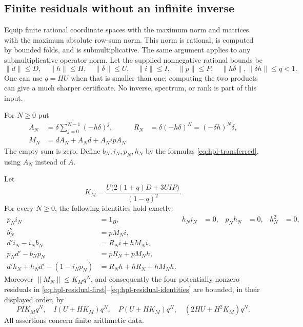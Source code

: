 \subsection{Finite residuals without an infinite inverse}

Equip finite rational coordinate spaces with the maximum norm and matrices
with the maximum absolute row-sum norm.  This norm is rational, is computed
by bounded folds, and is submultiplicative.  The same argument applies to
any submultiplicative operator norm.  Let the supplied nonnegative rational
bounds be
\[
 \|d\|\le D,\quad \|h\|\le H,\quad \|\delta\|\le U,
 \quad\|i\|\le I,\quad\|p\|\le P,
 \quad\|h\delta\|,\|\delta h\|\le q<1.
\]
One can use $q=HU$ when that is smaller than one; computing the two products
can give a much sharper certificate.  No inverse, spectrum, or rank is
part of this input.

For $N\ge0$ put
\begin{align}
 A_N&=\delta\sum_{j=0}^{N-1}(-h\delta)^j,
 &R_N&=\delta(-h\delta)^N=(-\delta h)^N\delta,\\
 M_N&=dA_N+A_Nd+A_NipA_N.
 \label{eq:hpl-finite-data}
\end{align}
The empty sum is zero.  Define $b_N,i_N,p_N,h_N$ by the formulas
\eqref{eq:hpl-transferred}, using $A_N$ instead of $A$.

\begin{theorem}
\label{thm:hpl-finite}
Let
\begin{equation}
 K_M=\frac{U\bigl(2(1+q)D+3UIP\bigr)}{(1-q)^2}.
 \label{eq:hpl-K}
\end{equation}
For every $N\ge0$, the following identities hold exactly:
\begin{align}
 p_Ni_N&=1_B,&h_Ni_N&=0,&p_Nh_N&=0,&h_N^2&=0,\label{eq:hpl-finite-normalizations}\\
 b_N^2&=pM_Ni,\label{eq:hpl-residual-first}\\
 d'i_N-i_Nb_N&=R_Ni+hM_Ni,\\
 p_Nd'-b_Np_N&=pR_N+pM_Nh,\\
 d'h_N+h_Nd'-(1-i_Np_N)&=R_Nh+hR_N+hM_Nh.
 \label{eq:hpl-residual-identities}
\end{align}
Moreover $\|M_N\|\le K_Mq^N$, and consequently the four potentially nonzero residuals
in \eqref{eq:hpl-residual-first}--\eqref{eq:hpl-residual-identities} are bounded, in their displayed order,
by
\begin{equation}
 PI K_M q^N,\quad
 I(U+HK_M)q^N,\quad
 P(U+HK_M)q^N,\quad
 (2HU+H^2K_M)q^N.
 \label{eq:hpl-residual-bounds}
\end{equation}
All assertions concern finite arithmetic data.
\end{theorem}

